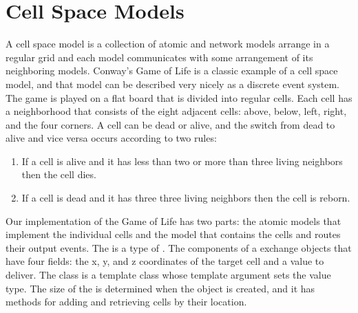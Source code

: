 \section{Cell Space Models}
A cell space model is a collection of atomic and network models arrange in a regular grid and each model communicates with some arrangement of its neighboring models. Conway's Game of Life is a classic example of a cell space model, and that model can be described very nicely as a discrete event system. The game is played on a flat board that is divided into regular cells. Each cell has a neighborhood that consists of the eight adjacent cells: above, below, left, right, and the four corners. A cell can be dead or alive, and the switch from dead to alive and vice versa occurs according to two rules:
\begin{enumerate}
\item If a cell is alive and it has less than two or more than three living neighbors then the cell dies.
\item If a cell is dead and it has three three living neighbors then the cell is reborn.
\end{enumerate}

Our implementation of the Game of Life has two parts: the atomic models that implement the individual cells and the  model that contains the cells and routes their output events. The  is a type of . The components of a  exchange  objects that have four fields: the x, y, and z coordinates of the target cell and a value to deliver. The  class is a template class whose template argument sets the value type. The size of the  is determined when the  object is created, and it has methods for adding and retrieving cells by their location. 

